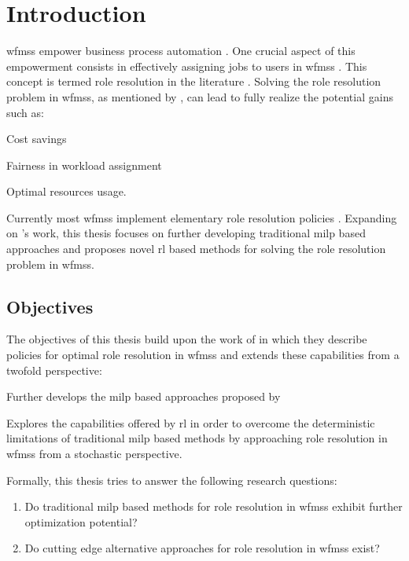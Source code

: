 \chapter{Introduction}
\label{ch:intro}

\glspl{wfms} empower business process automation \citep{Zeng2005}. One crucial aspect of this empowerment consists in effectively assigning jobs to users in \glspl{wfms} \citep{Zeng2005}. This concept is termed role resolution in the literature \citep{Cheng2000}. Solving the role resolution problem in \glspl{wfms}, as mentioned by \citet{Reijers2005}, can lead to fully realize the potential gains such as:
\begin{enumerate*}
	\item Cost savings
	\item Fairness in workload assignment
	\item Optimal resources usage.
\end{enumerate*}

Currently most \glspl{wfms} implement elementary role resolution policies \citep{Zeng2005}. Expanding on \citet{Zeng2005}'s work, this thesis focuses on further developing traditional \gls{milp} based approaches and proposes novel \gls{rl} based methods for solving the role resolution problem in \glspl{wfms}.


\section{Objectives}
\label{sec:objectives}

The objectives of this thesis build upon the work of \citet{Zeng2005} in which they describe policies for optimal role resolution in \glspl{wfms} and extends these capabilities from a twofold perspective:
\begin{enumerate*}
	\item Further develops the \gls{milp} based approaches proposed by \citet{Zeng2005}
	\item Explores the capabilities offered by \gls{rl} in order to overcome the deterministic limitations of traditional \gls{milp} based methods by approaching role resolution in \glspl{wfms} from a stochastic perspective.
\end{enumerate*}
Formally, this thesis tries to answer the following research questions:

\begin{enumerate}[label=\textbf{Q. \Roman*},ref=Research Question \Roman*]
\item Do traditional \gls{milp} based methods for role resolution in \glspl{wfms} exhibit further optimization potential? \label{rq:one}
\item Do cutting edge alternative approaches for role resolution in \glspl{wfms} exist? \label{rq:two}
\end{enumerate}

